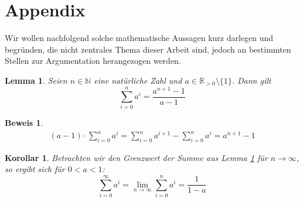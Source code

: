 \documentclass[a4paper]{article}
\newtheorem{korollar}[satz]{Korollar}
\newtheorem{lemma}[satz]{Lemma}
\theoremstyle{nonumberplain}
\newtheorem{beweis}{Beweis}
\begin{document}
\begin{comment}
	\addplot[ only marks,color=blue,mark=square,name path=f]
	coordinates {
		(33,0.2166)(95,0.4558)(210,0.8892)(397,1.5893)(674,2.6494)(1570,6.4088)(76,0.4086)(354,1.6069)(1067,4.5743)(2557,11.1483)(5257,27.398)(16495,81.2725)(172,0.8519)(1292,6.237)(5267,25.332)(15833,76.5412)(39158,194.1443)(164288,879.2178)(398,1.9171)(4487,22.1102)(24979,130.9343)(94408,510.1477)(280865,1570.9472)
	};
	
	\addplot[only marks,color=red,mark=triangle,name path=f]
	coordinates {
		(28,0.0228)(244,0.2634)(2188,1.3599)(19684,14.4951)(177148,173.7169)(1594324,2145.145)(14348908,35305.0664)
	};
	
	\addlegendentry{leader\_sync}
	\addlegendentry{herman}
	\end{axis}
	\end{tikzpicture}
\end{figure}
\end{comment}
\section{Appendix}

Wir wollen nachfolgend solche mathematische Aussagen kurz darlegen und begründen, die nicht zentrales Thema dieser Arbeit sind, jedoch an bestimmten Stellen zur Argumentation herangezogen werden.

\begin{lemma} \label{lem-geosum}
	Seien $n \in \mathbb{N}$ eine natürliche Zahl und $a \in \mathbb{R}_{>0}\setminus\{1\}$. Dann gilt
\begin{equation}
\sum_{i=0}^{n}{a^i} = \frac{a^{n+1}-1}{a-1}
\end{equation}
\end{lemma}
\begin{beweis}
\begin{align*}
	(a-1) \cdot \sum_{i=0}^{n}{a^i} = \sum_{i=0}^{n}{a^{i+1}} - \sum_{i=0}^{n}{a^i} = a^{n+1} - 1
\end{align*}
\end{beweis}

\begin{korollar} \label{kor-geosum}
Betrachten wir den Grenzwert der Summe aus Lemma \ref{lem-geosum} für $n \to \infty$, so ergibt sich für $0<a<1$:
\begin{equation}
\sum_{i=0}^{\infty}{a^i}
= \lim\limits_{n \to \infty} \sum_{i=0}^{n}{a^i}
= \frac{1}{1-a}
\end{equation}
\end{korollar}
\end{document}

